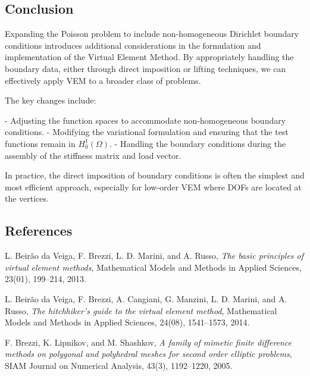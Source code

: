 \documentclass[class=article, crop=false]{standalone}
\begin{document}
\subsection{Conclusion}

Expanding the Poisson problem to include non-homogeneous Dirichlet boundary conditions introduces additional considerations in the formulation and implementation of the Virtual Element Method. By appropriately handling the boundary data, either through direct imposition or lifting techniques, we can effectively apply VEM to a broader class of problems.

The key changes include:

- Adjusting the function spaces to accommodate non-homogeneous boundary conditions.
- Modifying the variational formulation and ensuring that the test functions remain in $H_0^1(\Omega)$.
- Handling the boundary conditions during the assembly of the stiffness matrix and load vector.

In practice, the direct imposition of boundary conditions is often the simplest and most efficient approach, especially for low-order VEM where DOFs are located at the vertices.

\subsection{References}

\begin{thebibliography}{9}

L. Beir\~ao da Veiga, F. Brezzi, L. D. Marini, and A. Russo,
\newblock \emph{The basic principles of virtual element methods},
\newblock Mathematical Models and Methods in Applied Sciences, 23(01), 199--214, 2013.

L. Beir\~ao da Veiga, F. Brezzi, A. Cangiani, G. Manzini, L. D. Marini, and A. Russo,
\newblock \emph{The hitchhiker's guide to the virtual element method},
\newblock Mathematical Models and Methods in Applied Sciences, 24(08), 1541--1573, 2014.

F. Brezzi, K. Lipnikov, and M. Shashkov,
\newblock \emph{A family of mimetic finite difference methods on polygonal and polyhedral meshes for second order elliptic problems},
\newblock SIAM Journal on Numerical Analysis, 43(3), 1192--1220, 2005.

\end{thebibliography}
\end{document}
